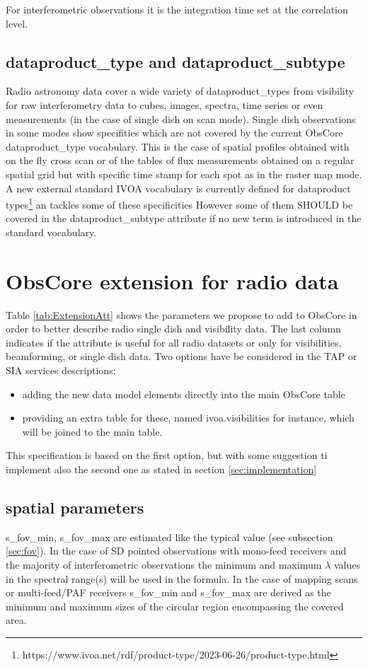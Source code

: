 \documentclass[11pt,a4paper]{ivoa}
\begin{document}
For interferometric observations it is the integration time set at the correlation level.


\subsection{dataproduct\_type and dataproduct\_subtype}

Radio astronomy data cover a wide variety of dataproduct\_types from visibility for raw interferometry data to cubes, images, spectra, time series or even measurements (in the case of single dish on scan mode). Single dish observations in some modes show specifities which are not covered by the current ObsCore dataproduct\_type vocabulary. This is the case of spatial profiles obtained with on the fly cross scan or of the tables of flux measurements obtained on a regular spatial grid but with specific time stamp for each spot as in the raster map  mode.
A new external standard IVOA vocabulary is currently defined for dataproduct types\footnote{https://www.ivoa.net/rdf/product-type/2023-06-26/product-type.html} an tackles some of these specificities
However some of them SHOULD be covered in the dataproduct\_subtype attribute if no new term is introduced in the standard vocabulary.

\section{ObsCore extension for radio data}

Table \ref{tab:ExtensionAtt} shows the %
parameters we propose to add to ObsCore in order to better describe radio single dish and visibility data.
The last column indicates if the attribute is useful for all radio datasets or only for visibilities, beamforming, or single dish data.
Two options have be considered in the TAP or SIA services descriptions:
\begin{itemize}
\item adding the new data model elements directly into the main ObsCore table
\item providing an extra table for these, named ivoa.visibilities for instance,  which will
be joined to the main table.
\end{itemize}
This specification is based on the first option, but with some suggestion ti implement also the second one as stated in section \ref{sec:implementation}

\subsection{spatial parameters}
s\_fov\_min, s\_fov\_max are estimated like the typical value (see subsection \ref{sec:fov}).
In the case of SD pointed observations with mono-feed receivers and the majority of interferometric observations the minimum and maximum $\lambda$ values in the spectral range(s) will be used in the formula. In the case of mapping scans or multi-feed/PAF receivers s\_fov\_min and s\_fov\_max are derived as the minimum and maximum sizes of the circular region encompassing the covered area.
\end{document}
